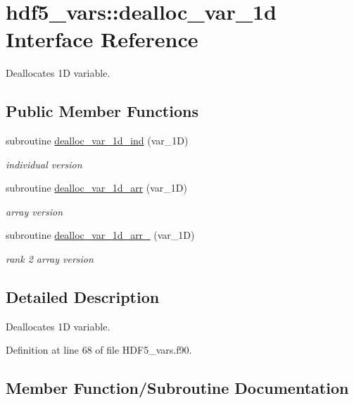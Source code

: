 \hypertarget{interfacehdf5__vars_1_1dealloc__var__1d}{}\section{hdf5\+\_\+vars\+:\+:dealloc\+\_\+var\+\_\+1d Interface Reference}
\label{interfacehdf5__vars_1_1dealloc__var__1d}


Deallocates 1D variable.  


\subsection*{Public Member Functions}
\begin{DoxyCompactItemize}
\item 
subroutine \hyperlink{interfacehdf5__vars_1_1dealloc__var__1d_ab6fbec4aba8db8df2e3a7fbdd0f30fd5}{dealloc\+\_\+var\+\_\+1d\+\_\+ind} (var\+\_\+1D)
\begin{DoxyCompactList}\small\item\em individual version \end{DoxyCompactList}\item 
subroutine \hyperlink{interfacehdf5__vars_1_1dealloc__var__1d_a7fd8fe4c03301116dac93b7d47e67c77}{dealloc\+\_\+var\+\_\+1d\+\_\+arr} (var\+\_\+1D)
\begin{DoxyCompactList}\small\item\em array version \end{DoxyCompactList}\item 
subroutine \hyperlink{interfacehdf5__vars_1_1dealloc__var__1d_ae0984cd8e6d60ef3297c3662d0789dbb}{dealloc\+\_\+var\+\_\+1d\+\_\+arr\+\_} (var\+\_\+1D)
\begin{DoxyCompactList}\small\item\em rank 2 array version \end{DoxyCompactList}\end{DoxyCompactItemize}


\subsection{Detailed Description}
Deallocates 1D variable. 

Definition at line 68 of file H\+D\+F5\+\_\+vars.\+f90.



\subsection{Member Function/\+Subroutine Documentation}
\mbox{\label{interfacehdf5__vars_1_1dealloc__var__1d_a7fd8fe4c03301116dac93b7d47e67c77}} 
